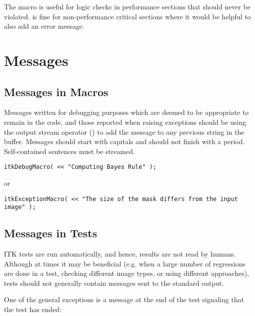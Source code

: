 The  macro is useful for logic
checks in performance sections that should never be violated.
 is fine for non-performance critical sections where
it would be helpful to also add an error message.


\section{Messages}
\label{sec:Messages}


\subsection{Messages in Macros}
\label{sec:MessagesInMacros}

Messages written for debugging purposes which are deemed to be appropriate to
remain in the code, and those reported when raising exceptions should be using
the output stream operator (\code{<<}) to add the message to any previous string
in the buffer. Messages should start with capitals and should not finish with a
period. Self-contained sentences must be streamed.

\small
\begin{verbatim}
itkDebugMacro( << "Computing Bayes Rule" );
\end{verbatim}
\normalsize

or

\small
\begin{verbatim}
itkExceptionMacro( << "The size of the mask differs from the input image" );
\end{verbatim}
\normalsize


\subsection{Messages in Tests}
\label{subsec:MessagesInTests}

ITK tests are run automatically, and hence, results are not read by humans.
Although at times it may be beneficial (e.g. when a large number of regressions
are done in a test, checking different image types, or using different
approaches), tests should not generally contain messages sent to the standard
output.

One of the general exceptions is a message at the end of the test signaling
that the test has ended:


